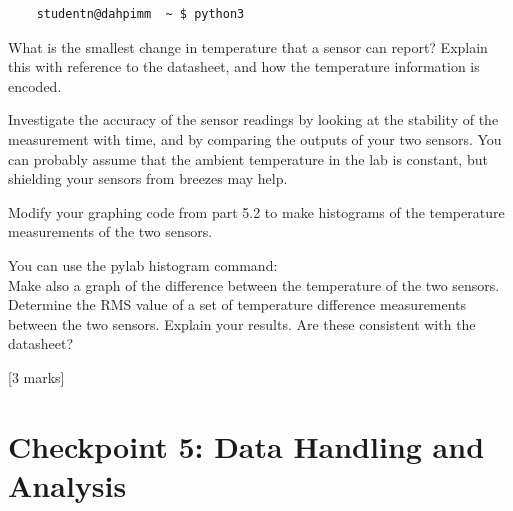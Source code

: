 \begin{enumerate}
\begin{verbatim}
    studentn@dahpimm  ~ $ python3
\end{verbatim}


What is the smallest change in temperature that a sensor can report? Explain this with reference to the datasheet, and how the temperature information is encoded.

Investigate the accuracy of the sensor readings by looking at the stability of the measurement with time, and by comparing the outputs of your two sensors. You can probably assume that the ambient temperature in the lab is constant, but shielding your sensors from breezes may help.

Modify your graphing code from part 5.2 to make histograms of the temperature measurements of the two sensors. 

You can use the pylab histogram command:\\

Make also a graph of the difference between the temperature of the two sensors. Determine the RMS value of a set of temperature difference measurements between the two sensors. Explain your results. Are these consistent with the datasheet?

\hfill [3 marks]


\end{enumerate}


\newpage
\section{Checkpoint 5: Data Handling and Analysis}

